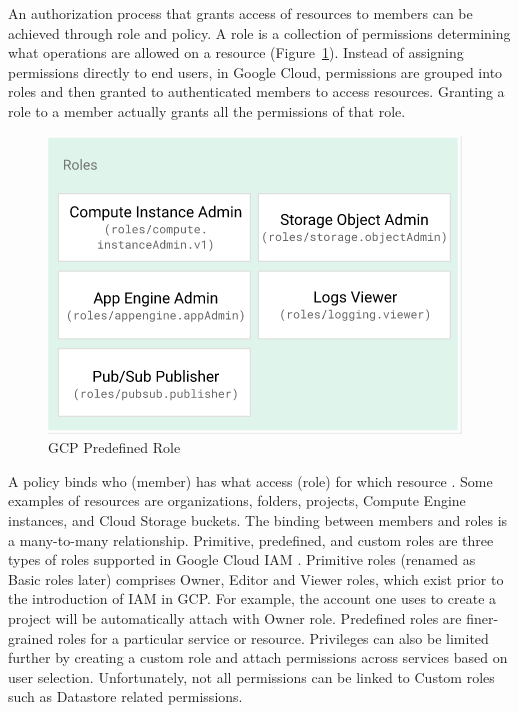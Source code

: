 \documentclass[a4paper,twoside]{article}
\begin{document}
An authorization process that grants access of resources to members can be achieved through role and policy. A role is a collection of permissions determining what operations are allowed on a resource (Figure~\ref{fig:role}). Instead of assigning permissions directly to end users, in Google Cloud, permissions are grouped into roles and then granted to authenticated members to access resources. Granting a role to a member actually grants all the permissions of that role.
\begin{figure}[!h]
  \centering
  \includegraphics[width=\linewidth]{pic/role}
  \caption {GCP Predefined Role}
  \label{fig:role}
\end{figure}
A policy binds who (member) has what access (role) for which resource \cite{Googlecloudiam}. Some examples of resources are organizations, folders, projects, Compute Engine instances, and Cloud Storage buckets. The binding between members and roles is a many-to-many relationship.
Primitive, predefined, and custom roles are three types of roles supported in Google Cloud IAM \cite{googlecloudrole}. Primitive roles (renamed as Basic roles later) comprises Owner, Editor and Viewer roles, which exist prior to the introduction of IAM in GCP. For example, the account one uses to create a project will be automatically attach with Owner role. Predefined roles are finer-grained roles for a particular service or resource. Privileges can also be limited further by creating a custom role and attach permissions across services based on user selection. Unfortunately, not all permissions can be linked to Custom roles such as Datastore related permissions. 
\end{document}
